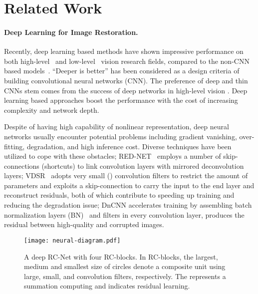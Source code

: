 \documentclass[10pt,twocolumn,letterpaper]{article}
\begin{document}
\section{Related Work}

\paragraph{Deep Learning for Image Restoration.}Recently, deep learning based methods have shown impressive performance on both high-level~\cite{krizhevsky2012imagenet,szegedy2015going,he2016deep} and low-level~\cite{zhang2016beyond,kim2016accurate,mao2016image,dong2014learning} vision research fields, compared to the non-CNN based models~\cite{dabov2009bm3d, gu2014weighted,timofte2014a+,huang2015single}.  ``Deeper is better'' has been considered as a design criteria of building convolutional neural networks (CNN). The preference of deep and thin CNNs stem comes from the success of deep networks in high-level vision \cite{krizhevsky2012imagenet}. Deep learning based approaches boost the performance with the cost of increasing complexity and network depth.


Despite of having high capability of nonlinear representation, deep neural networks usually encounter potential problems including gradient vanishing, over-fitting, degradation, and high inference cost. Diverse techniques have been utilized to cope with these obstacles; RED-NET~\cite{mao2016image} employs a number of skip-connections (shortcuts) to link convolution layers with mirrored deconvolution layers; VDSR~\cite{kim2016accurate} adopts very small () convolution filters to restrict the amount of parameters and exploits a skip-connection to carry the input to the
end layer and reconstruct residuals, both of which contribute to speeding up training and reducing the degradation issue; DnCNN accelerates training by assembling batch normalization layers (BN)~\cite{ioffe2015batch} and  filters in every convolution layer, produces the residual between high-quality and corrupted images. 

\begin{figure*}[t]
  \centering
  \texttt{[image: neural-diagram.pdf]}
  \caption{A deep RC-Net with four RC-blocks. In RC-blocks, the largest, medium  and smallest size of circles denote a composite unit using large, small, and  convolution filters, respectively. The  represents a summation computing and indicates residual learning.}
\label{fig:rc-struc}
\end{figure*}
\end{document}
